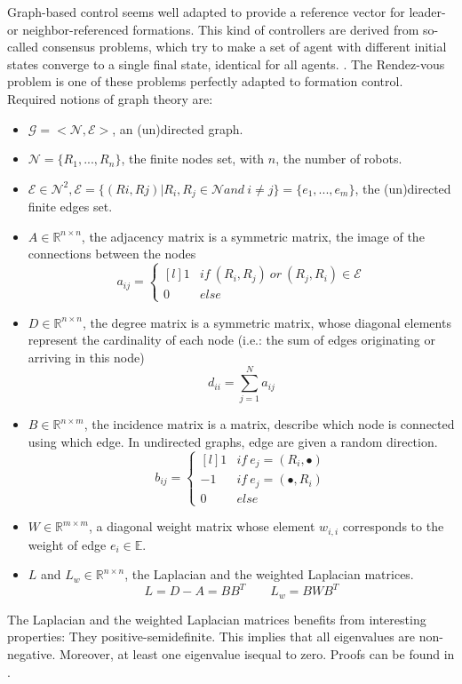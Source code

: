 \documentclass[a4paper, 12pt]{report}
\begin{document}
Graph-based control seems well adapted to provide a reference vector for leader- or neighbor-referenced formations. This kind of controllers are derived from so-called consensus problems, which try to make a set of agent with different initial states converge to a single final state, identical for all agents. \cite{Ren2005}. The Rendez-vous problem \cite{Gowal2013} is one of these problems perfectly adapted to formation control. Required notions of graph theory are: 
\begin{itemize}
\item $\mathcal{G} = <\mathcal{N}, \mathcal{E}>$, an (un)directed graph.
\item $\mathcal{N} = \{R_1, ..., R_n\}$, the finite nodes set,  with $n$, the number of robots.
\item $\mathcal{E} \in \mathcal{N}^2, \mathcal{E} = \{(Ri,Rj)| R_i, R_j \in \mathcal{N} and\ i \neq j\} = \{e_1, ..., e_m\} $, the (un)directed finite edges set.
\item $A \in  \mathbb{R}^{n \times n} $, the adjacency matrix is a symmetric matrix, the image of the connections between the nodes
\[a_{ij} =  \left\{ \begin{matrix*}[l] 1 & if\ (R_i, R_j)\ or\ (R_j, R_i) \in \mathcal{E} \\ 0 & else \end{matrix*} \right.\]
\item $D \in  \mathbb{R}^{n \times n} $, the degree matrix is a symmetric matrix, whose diagonal elements represent the cardinality of each node (i.e.: the sum of edges originating or arriving in this node)
\[d_{ii} =  \sum_{j=1}^{N} a_{ij}\]
\item $B \in  \mathbb{R}^{n \times m} $, the incidence matrix is a matrix, describe which node is connected using which edge. In undirected graphs, edge are given a random direction.
\[b_{ij} =  \left\{ \begin{matrix*}[l] 1 & if\ e_j = (R_i, \bullet) \\-1 & if\ e_j = (\bullet, R_i)  \\ 0 & else \end{matrix*} \right.\]
\item $W \in \mathbb{R}^{m\times m} $, a diagonal weight matrix whose element $w_{i,i}$ corresponds to the weight of edge $e_i \in \mathbb{E}$.
\item $L$ and $L_w\in \mathbb{R}^{n\times n} $, the Laplacian and the weighted Laplacian matrices.
\[ L = D-A = BB^T \qquad L_w = BWB^T\]
\end{itemize}  
The Laplacian and the weighted Laplacian matrices benefits from interesting properties: They positive-semidefinite. This implies that all eigenvalues are non-negative. Moreover, at least one eigenvalue isequal to zero. Proofs can be found in \cite{Gowal2013}. 
\end{document}
